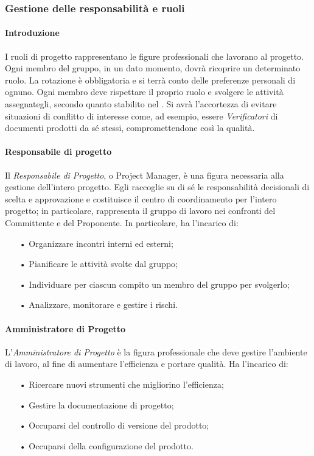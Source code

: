 \subsubsection{Gestione delle responsabilità e ruoli}

\paragraph{Introduzione}
I ruoli di progetto rappresentano le figure professionali che lavorano al progetto. Ogni membro del gruppo, in un dato momento, dovrà ricoprire un determinato ruolo.  
\newline
La rotazione è obbligatoria e si terrà conto delle preferenze personali di ognuno. Ogni membro deve rispettare il proprio ruolo e svolgere le attività assegnategli, secondo quanto stabilito nel \PdP. Si avrà l'accortezza di evitare situazioni di conflitto di interesse come, ad esempio, essere \textit{Verificatori} di documenti prodotti da sé stessi, compromettendone così la qualità.

\paragraph{Responsabile di progetto}
Il \textit{Responsabile di Progetto}, o Project Manager, è una figura necessaria alla gestione dell’intero progetto. Egli raccoglie su di sé le responsabilità decisionali di scelta e approvazione e costituisce il centro di coordinamento per l'intero progetto; in particolare, rappresenta il gruppo di lavoro nei confronti del Committente e del Proponente. 
\newline
In particolare, ha l'incarico di:
\begin{itemize}
\item[•] Organizzare incontri interni ed esterni;
\item[•] Pianificare le attività svolte dal gruppo;
\item[•] Individuare per ciascun compito un membro del gruppo per svolgerlo;
\item[•] Analizzare, monitorare e gestire i rischi.
\end{itemize}

\paragraph{Amministratore di Progetto}
L’\textit{Amministratore di Progetto} è la figura professionale che deve gestire l’ambiente di lavoro, al fine di aumentare l’efficienza e portare qualità. 
\newline
Ha l'incarico di:
\begin{itemize}
\item[•] Ricercare nuovi strumenti che migliorino l’efficienza;
\item[•] Gestire la documentazione di progetto;
\item[•] Occuparsi del controllo di versione del prodotto;
\item[•] Occuparsi della configurazione del prodotto.
\end{itemize}

